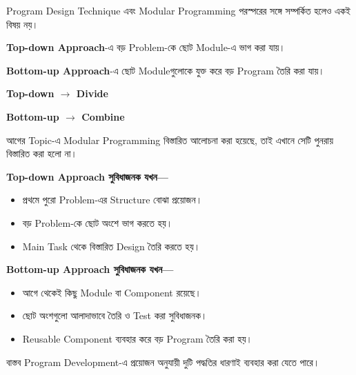 Program Design Technique এবং Modular Programming
পরস্পরের সঙ্গে সম্পর্কিত হলেও একই বিষয় নয়।

\textbf{Top-down Approach}-এ বড় Problem-কে ছোট Module-এ
ভাগ করা যায়।

\textbf{Bottom-up Approach}-এ ছোট Moduleগুলোকে যুক্ত করে
বড় Program তৈরি করা যায়।

\begin{center}

\textbf{
Top-down
\(\longrightarrow\)
Divide
}

\vspace{0.5mm}

\textbf{
Bottom-up
\(\longrightarrow\)
Combine
}

\end{center}

আগের Topic-এ Modular Programming বিস্তারিত আলোচনা করা হয়েছে,
তাই এখানে সেটি পুনরায় বিস্তারিত করা হলো না।


\textbf{\color{darkTeal}Top-down Approach সুবিধাজনক যখন—}

\begin{itemize}

\item প্রথমে পুরো Problem-এর Structure বোঝা প্রয়োজন।

\item বড় Problem-কে ছোট অংশে ভাগ করতে হয়।

\item Main Task থেকে বিস্তারিত Design তৈরি করতে হয়।

\end{itemize}

\textbf{\color{darkTeal}Bottom-up Approach সুবিধাজনক যখন—}

\begin{itemize}

\item আগে থেকেই কিছু Module বা Component রয়েছে।

\item ছোট অংশগুলো আলাদাভাবে তৈরি ও Test করা সুবিধাজনক।

\item Reusable Component ব্যবহার করে বড় Program তৈরি করা হয়।

\end{itemize}

বাস্তব Program Development-এ প্রয়োজন অনুযায়ী
দুটি পদ্ধতির ধারণাই ব্যবহার করা যেতে পারে।

